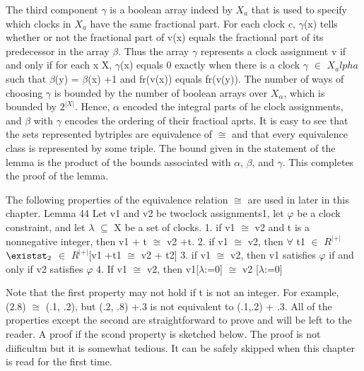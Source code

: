 \documentclass{article}
\begin{document}
	The third component  $\gamma$ is a boolean array indeed by $X_a$ that is used to specify which clocks in $X_a$ have the same fractional part. For each clock c, $\gamma$(x) tells whether or not the fractional part of v(x) equals  the fractional part of its predecessor in the array $\beta$. Thus the array $\gamma$ represents a clock assignment v if and only if for each x \n X, $\gamma$(x) equals 0 exactly when there is a clock $\gamma$ $\in$ $X_alpha$ such that $\beta$(y) = $\beta$(x) +1 and fr(v(x)) equals fr(v(y)). The number of ways of choosing $\gamma$ is bounded by the number of boolean arrays over $X_\alpha$, which is bounded by $2^{|X|}$.
	Hence, $\alpha$ encoded the integral parts of he clock assignments, and $\beta$ with $\gamma$ encodes the ordering of their fractioal aprts. It is easy to see that the sets represented bytriples are equivalence of $\cong$ and that every equivalence class is represented by some triple. The bound given in the statement of the lemma is the product of the bounds associated with $\alpha$, $\beta$, and $\gamma$. This completes the proof of the lemma.\cite[p~276]{clarkmodelchecking} \\
	\newline
	
	
	The following properties of the equivalence relation $\cong$ are used in later  in this chapter.
	Lemma 44
	Let v1 and v2 be twoclock assignments1, let $\varphi$ be a clock constraint, and let $\lambda$ $\subseteq$ X be a set of clocks.
	1. if v1 $\cong$ v2 and t is a nonnegative integer, then v1 + t $\cong$ v2 +t.
	2. if v1 $\cong$ v2, then $\forall$ t1 $\in$ $R^{|+|}$ $\existst_2$ $\in$ $R^{|+|}$[v1 +t1 $\cong$ v2 + t2]
	3. if v1 $\cong$ v2, then v1 satisfies $\varphi$ if and only if v2 satisfies $\varphi$
	4. If v1 $\cong$ v2, then v1[$\lambda$:=0] $\cong$ v2 [$\lambda$:=0] \cite[p~277]{clarkmodelchecking}
	\\
	\newline
	
	Note that the first property may not hold if t is not an integer. For example, (2.8) $\cong$ (.1, .2),
	but (.2, .8) +.3 is not equivalent to (.1,.2) + .3. All of the properties except the second are straightforward to prove and will be left to the reader. A proof if the scond property is sketched below. The proof is not diificultm but it is somewhat tedious. It can be safely skipped when this chapter is read for the first time.
	\cite[p~277]{clarkmodelchecking}
	
	\\
	\newline
	
\end{document}
